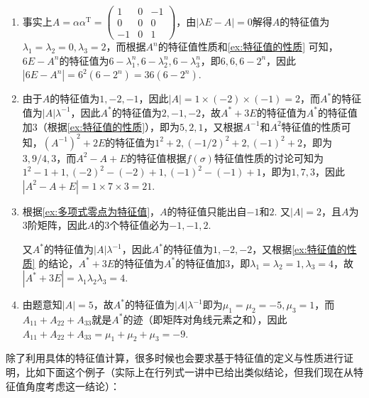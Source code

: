 \begin{solution}
    \begin{enumerate}
        \item 事实上$A=\alpha\alpha^\mathrm{T}=\begin{pmatrix}
                      1 & 0 & -1 \\ 0 & 0 & 0 \\ -1 & 0 & 1
                  \end{pmatrix}$，由$|\lambda E-A|=0$解得$A$的特征值为$\lambda_1=\lambda_2=0,\lambda_3=2$，而根据$A^n$的特征值性质和\autoref{ex:特征值的性质} 可知，$6E-A^n$的特征值为$6-\lambda_1^n,6-\lambda_2^n,6-\lambda_3^n$，即$6,6,6-2^n$，因此$|6E-A^n|=6^2(6-2^n)=36(6-2^n)$.

        \item 由于$A$的特征值为$1,-2,-1$，因此$|A|=1\times(-2)\times(-1)=2$，而$A^*$的特征值为$|A|\lambda^{-1}$，因此$A^*$的特征值为$2,-1,-2$，故$A^*+3E$的特征值为$A^*$的特征值加3（根据\autoref{ex:特征值的性质}），即为$5,2,1$，又根据$A^{-1}$和$A^2$特征值的性质可知，$(A^{-1})^2+2E$的特征值为$1^2+2,(-1/2)^2+2,(-1)^2+2$，即为$3,9/4,3$，而$A^2-A+E$的特征值根据$f(\sigma)$特征值性质的讨论可知为$1^2-1+1,(-2)^2-(-2)+1,(-1)^2-(-1)+1$，即为$1,7,3$，因此$|A^2-A+E|=1\times 7\times 3=21$.

        \item 根据\autoref{ex:多项式零点为特征值}，$A$的特征值只能出自$-1$和$2$. 又$|A|=2$，且$A$为3阶矩阵，因此$A$的3个特征值必为$-1,-1,2$.

              又$A^*$的特征值为$|A|\lambda^{-1}$，因此$A^*$的特征值为$1,-2,-2$，又根据\autoref{ex:特征值的性质} 的结论，$A^*+3E$的特征值为$A^*$的特征值加3，即$\lambda_1=\lambda_2=1,\lambda_3=4$，故$|A^*+3E|=\lambda_1\lambda_2\lambda_3=4$.

        \item 由题意知$|A|=5$，故$A^*$的特征值为$|A|\lambda^{-1}$即为$\mu_1=\mu_2=-5,\mu_3=1$，而$A_{11}+A_{22}+A_{33}$就是$A^*$的迹（即矩阵对角线元素之和），因此$A_{11}+A_{22}+A_{33}=\mu_1+\mu_2+\mu_3=-9$.
    \end{enumerate}
\end{solution}

除了利用具体的特征值计算，很多时候也会要求基于特征值的定义与性质进行证明，比如下面这个例子（实际上在行列式一讲中已给出类似结论，但我们现在从特征值角度考虑这一结论）：

